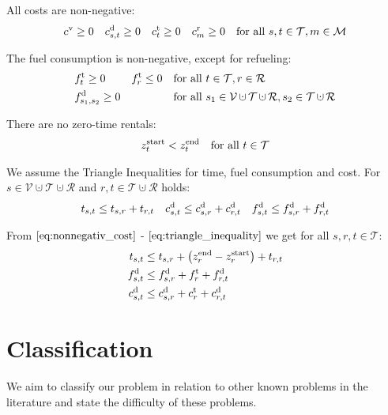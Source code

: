 All costs are non-negative:
\begin{align}
\label{eq:nonnegativ_cost}
	c^{\operatorname{v}}\geq 0 && c^{\operatorname{d}}_{s,t}\geq 0 && c^{\operatorname{t}}_t\geq 0 && c^{\operatorname{r}}_m\geq 0 && \text{for all } s,t\in\mathcal{T}, m\in\mathcal{M}
\end{align}

The fuel consumption is non-negative, except for refueling:
\begin{align}
	& \ft_t\geq 0 && \ft_r\leq 0 && \text{for all } t\in\mathcal{T}, r\in\mathcal{R} \\
	& \fd_{s_1,s_2} \geq 0 &&&& \text{for all } s_1\in\mathcal{V}\cupdot\mathcal{T}\cupdot\mathcal{R},s_2\in\mathcal{T}\cupdot\mathcal{R}
\end{align}

There are no zero-time rentals:
\begin{align}
\label{eq:notime_trip}
	z^{\operatorname{start}}_t < z^{\operatorname{end}}_t && \text{for all } t\in\mathcal{T}
\end{align}

We assume the Triangle Inequalities for time, fuel consumption and cost. For $s\in\mathcal{V}\cupdot\mathcal{T}\cupdot\mathcal{R}$ and $r,t\in\mathcal{T}\cupdot\mathcal{R}$ holds:
\begin{align}
\label{eq:triangle_inequality}
	t_{s,t} \leq t_{s,r} + t_{r,t} && c^{\operatorname{d}}_{s,t} \leq c^{\operatorname{d}}_{s,r} + c^{\operatorname{d}}_{r,t} && f^{\operatorname{d}}_{s,t} \leq f^{\operatorname{d}}_{s,r} + f^{\operatorname{d}}_{r,t}
\end{align}

From $\eqref{eq:nonnegativ_cost}$ - $\eqref{eq:triangle_inequality}$ we get for all $s,r,t\in\mathcal{T}$:
\begin{align}
	t_{s,t} & \leq t_{s,r} + \left(z^{\operatorname{end}}_r - z^{\operatorname{start}}_r\right) + t_{r,t} \label{eq:triangle_inequality_time} \\
	f^{\operatorname{d}}_{s,t} & \leq f^{\operatorname{d}}_{s,r} + f^{\operatorname{t}}_{r} + f^{\operatorname{d}}_{r,t} \label{eq:triangle_inequality_fuel} \\
	c^{\operatorname{d}}_{s,t} & \leq c^{\operatorname{d}}_{s,r} + c^{\operatorname{t}}_{r} + c^{\operatorname{d}}_{r,t} \label{eq:triangle_inequality_cost}
\end{align}


\section{Classification}
\label{sec:classification}

We aim to classify our problem in relation to other known problems in the literature and state the difficulty of these problems.

